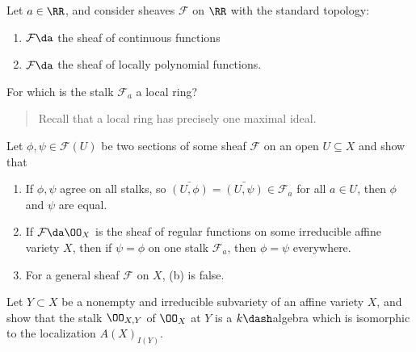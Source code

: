\begin{exercise}[Gathmann 3.21]

Let \(a\in \RR\), and consider sheaves \(\mathcal{F}\) on \(\RR\) with
the standard topology:

\begin{enumerate}
\def\labelenumi{\arabic{enumi}.}
\tightlist
\item
  \(\mathcal{F} \da\) the sheaf of continuous functions
\item
  \(\mathcal{F} \da\) the sheaf of locally polynomial functions.
\end{enumerate}

For which is the stalk \(\mathcal{F}_a\) a local ring?

\begin{quote}
Recall that a local ring has precisely one maximal ideal.
\end{quote}

\end{exercise}

\begin{exercise}[Gathmann 3.22]

Let \(\phi, \psi \in \mathcal{F}(U)\) be two sections of some sheaf
\(\mathcal{F}\) on an open \(U\subseteq X\) and show that

\begin{enumerate}
\def\labelenumi{\alph{enumi}.}
\item
  If \(\phi, \psi\) agree on all stalks, so
  \(\bar{(U, \phi)} = \bar{(U, \psi)} \in \mathcal{F}_a\) for all
  \(a\in U\), then \(\phi\) and \(\psi\) are equal.
\item
  If \(\mathcal{F} \da \OO_X\) is the sheaf of regular functions on some
  irreducible affine variety \(X\), then if \(\psi = \phi\) on one stalk
  \(\mathcal{F}_a\), then \(\phi = \psi\) everywhere.
\item
  For a general sheaf \(\mathcal{F}\) on \(X\), (b) is false.
\end{enumerate}

\end{exercise}

\begin{exercise}

Let \(Y\subset X\) be a nonempty and irreducible subvariety of an affine
variety \(X\), and show that the stalk \(\OO_{X, Y}\) of \(\OO_X\) at
\(Y\) is a \(k\dash\)algebra which is isomorphic to the localization
\(A(X)_{I(Y)}\).

\end{exercise}

